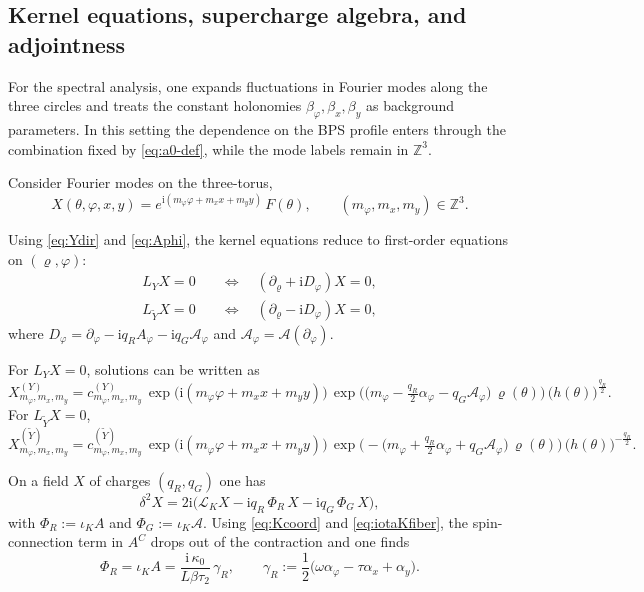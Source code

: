 \documentclass[11pt,a4paper]{article}
\numberwithin{equation}{section}
\theoremstyle{plain}
\theoremstyle{definition}
\theoremstyle{remark}
\newcommand{\ii}{\mathrm{i}}
\begin{document}
\subsection{Kernel equations, supercharge algebra, and adjointness}

For the spectral analysis, one expands fluctuations in Fourier modes along the three circles and treats the constant holonomies
$\beta_\varphi,\beta_x,\beta_y$ as background parameters. In this setting the dependence on the BPS profile
enters through the combination fixed by \eqref{eq:a0-def}, while the mode labels remain in $\mathbb{Z}^3$.

Consider Fourier modes on the three-torus,
\begin{equation}
X(\theta,\varphi,x,y)=e^{\ii(m_\varphi\varphi+m_x x+m_y y)}\,F(\theta),
\qquad (m_\varphi,m_x,m_y)\in\mathbb{Z}^3.
\label{eq:Fourier}
\end{equation}


Using \eqref{eq:Ydir} and \eqref{eq:Aphi}, the kernel equations reduce to first-order equations on $(\varrho,\varphi)$:
\begin{align}
L_Y X=0 \quad &\Longleftrightarrow\quad (\partial_\varrho+\ii D_\varphi)X=0,
\label{eq:LYeq}\\
L_{\widetilde Y} X=0 \quad &\Longleftrightarrow\quad (\partial_\varrho-\ii D_\varphi)X=0,
\label{eq:LYteq}
\end{align}
where $D_\varphi=\partial_\varphi-\ii q_R A_\varphi-\ii q_G \mathcal A_\varphi$ and $\mathcal A_\varphi=\mathcal A(\partial_\varphi)$.


For $L_Y X=0$, solutions can be written as
\begin{equation}
X^{(Y)}_{m_\varphi,m_x,m_y}
=
c^{(Y)}_{m_\varphi,m_x,m_y}\,
\exp\!\big(\ii(m_\varphi\varphi+m_x x+m_y y)\big)\,
\exp\!\Big(\big(m_\varphi-\tfrac{q_R}{2}\alpha_\varphi-q_G \mathcal A_\varphi\big)\,\varrho(\theta)\Big)\,
\big(h(\theta)\big)^{\frac{q_R}{2}} .
\label{eq:kerYmodes}
\end{equation}
For $L_{\widetilde Y} X=0$,
\begin{equation}
X^{(\widetilde Y)}_{m_\varphi,m_x,m_y}
=
c^{(\widetilde Y)}_{m_\varphi,m_x,m_y}\,
\exp\!\big(\ii(m_\varphi\varphi+m_x x+m_y y)\big)\,
\exp\!\Big(-\big(m_\varphi+\tfrac{q_R}{2}\alpha_\varphi+q_G \mathcal A_\varphi\big)\,\varrho(\theta)\Big)\,
\big(h(\theta)\big)^{-\frac{q_R}{2}} .
\label{eq:kerYtilmodes}
\end{equation}


On a field $X$ of charges $(q_R,q_G)$ one has
\begin{equation}
\delta^2 X
=
2\ii\Big(\mathcal{L}_K X - \ii q_R\,\Phi_R\,X - \ii q_G\,\Phi_G\,X\Big),
\label{eq:delta2schem}
\end{equation}
with $\Phi_R:=\iota_K A$ and $\Phi_G:=\iota_K\mathcal A$.
Using \eqref{eq:Kcoord} and \eqref{eq:iotaKfiber}, the spin-connection term in $A^C$ drops out of the contraction and one finds
\begin{equation}
\Phi_R
=
\iota_K A
=
\frac{\ii\,\kappa_0}{L\beta\tau_2}\,\gamma_R,
\qquad
\gamma_R:=\frac12\big(\omega \alpha_\varphi - \tau\alpha_x+\alpha_y\big).
\label{eq:gammaR}
\end{equation}
\end{document}
